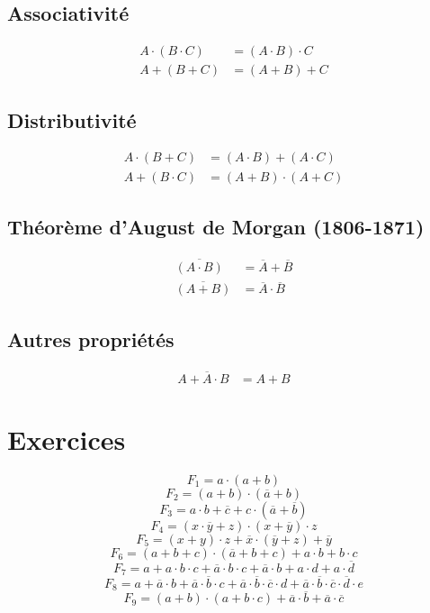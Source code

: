 \documentclass{article}
\begin{document}
\begin{multicols}{2}
\subsection{Associativité}
\begin{align}
    A \cdot (B \cdot C) & = (A \cdot B) \cdot C \\
    A + (B + C) & = (A + B) + C 
\end{align}

\subsection{Distributivité}
\begin{align}
    A \cdot (B + C) & = (A \cdot B) + (A \cdot C) \\
    A + (B \cdot C) & = (A + B) \cdot (A + C) 
\end{align}

\subsection{Théorème d'August de Morgan (1806-1871)}
\begin{align}
    \overline{(A \cdot B)} & = \overline{A} + \overline{B} \\
    \overline{(A + B)} & = \overline{A} \cdot \overline{B} 
\end{align}


\subsection{Autres propriétés}
\begin{align}
    A + \overline{A}\cdot B & =A+B
\end{align}

\end{multicols}

\vspace{15pt}

\section{Exercices}

\[ F_1 = a \cdot (a + b) \]
\[ F_2 = (a + b) \cdot (\overline{a} + b) \]
\[ F_3 = a \cdot b + \overline{c} + c \cdot (\overline{a} + \overline{b}) \]
\[ F_4 = (x \cdot \overline{y} + z) \cdot (x + \overline{y}) \cdot z \]
\[ F_5 = (x + y) \cdot z + \overline{x} \cdot (\overline{y} + z) + \overline{y} \]
\[ F_6 = (a + b + c) \cdot (\overline{a} + b + c) + a \cdot b + b \cdot c \]
\[ F_7 = a + a \cdot b \cdot c + \overline{a} \cdot b \cdot c + \overline{a} \cdot b + a \cdot d + a \cdot \overline{d} \]
\[ F_8 = a + \overline{a} \cdot b + \overline{a} \cdot \overline{b} \cdot c + \overline{a} \cdot \overline{b}\cdot \overline{c} \cdot d  + \overline{a} \cdot \overline{b}\cdot \overline{c} \cdot \overline{d}  \cdot e \]
\[ F_9 = (a + b) \cdot (a + b \cdot c) + \overline{a} \cdot \overline{b} + \overline{a} \cdot \overline{c} \]
\end{document}
